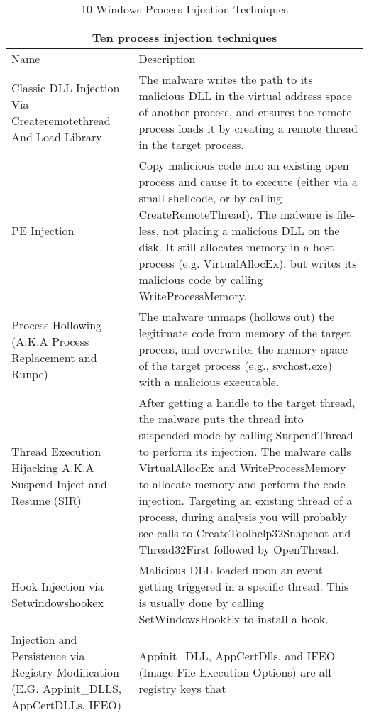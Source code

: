 \begin{table}[!ht]
\centering
\caption{10 Windows Process Injection Techniques \autocite{Hosseini:2017}}
\begin{tabular}{ |p{3.5cm}||p{10.5cm}|  }
  \hline
  \multicolumn{2}{|c|}{Ten process injection techniques} \\
  \hline
  Name & Description \\
  \hline
  Classic DLL Injection Via Createremotethread And Load Library
             & The malware writes the path to its malicious DLL in the virtual address space of another process,
               and ensures the remote process loads it by creating a remote thread in the target process. \\
  \hline
  PE Injection
             & Copy malicious code into an existing open process and cause it to execute (either via a
               small shellcode, or by calling CreateRemoteThread). The malware is file-less, not placing a malicious DLL
               on the disk.  It still allocates memory in a host process (e.g. VirtualAllocEx),
               but writes its malicious code by calling WriteProcessMemory. \\
  \hline
  Process Hollowing (A.K.A Process Replacement and Runpe)
             & The malware unmaps (hollows out) the legitimate code from memory of the target process, and
               overwrites the memory space of the target process (e.g., svchost.exe) with a malicious executable.\\
  \hline
  Thread Execution Hijacking A.K.A Suspend Inject and Resume (SIR)
             & After getting a handle to the target thread, the malware puts the thread into suspended mode by
               calling SuspendThread to perform its injection. The malware calls VirtualAllocEx and
               WriteProcessMemory to allocate memory and perform the code injection. Targeting an existing thread
               of a process, during analysis you will probably see calls to CreateToolhelp32Snapshot and
               Thread32First followed by OpenThread. \\
  \hline
  Hook Injection via Setwindowshookex
             & Malicious DLL loaded upon an event getting triggered in a specific thread. This is usually
               done by calling SetWindowsHookEx to install a hook. \\
  \hline
  Injection and Persistence via Registry Modification (E.G. Appinit\_DLLS, AppCertDLLs, IFEO)
             & Appinit\_DLL, AppCertDlls, and IFEO (Image File Execution Options) are all registry keys that

\end{tabular}
\end{table}
